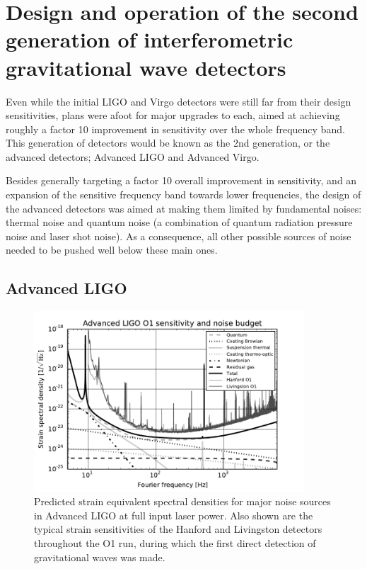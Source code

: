 \section{Design and operation of the second generation of interferometric gravitational wave detectors}\label{subsec:2ndgen}

Even while the initial LIGO and Virgo detectors were still far from their design sensitivities, plans were afoot for major  upgrades to each, aimed at achieving roughly a factor 10 improvement in sensitivity over the whole frequency band. 
This generation of detectors would be known as the 2nd generation, or the advanced detectors; Advanced LIGO and 
Advanced Virgo. 

Besides generally targeting a factor 10 overall improvement in sensitivity, and an expansion of the sensitive 
frequency band towards lower frequencies, the design of the advanced detectors was aimed at making them 
limited by fundamental noises: thermal noise and quantum noise (a combination of quantum radiation pressure noise 
and laser shot noise).
As a consequence, all other possible sources of noise needed to be pushed well below these main ones.

\subsection{Advanced LIGO}
\begin{figure}[htb]
	\begin{center}
		\includegraphics[width=0.9\textwidth]{aLIGOnbudget_gray.pdf}
		\caption{\label{fig:aLIGOnbudget}Predicted strain equivalent spectral densities for major noise sources in Advanced LIGO at full input laser power. Also shown are the typical strain sensitivities of the Hanford and Livingston detectors throughout the O1 run, during which the first direct detection of gravitational waves was made.}
	\end{center}
\end{figure}

